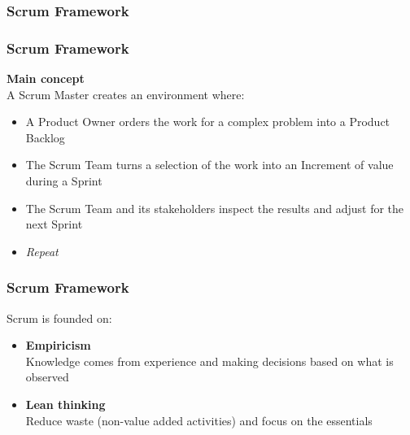 \begin{frame}
	\frametitle{Scrum Framework}
\end{frame}

\begin{frame}
	\frametitle{Scrum Framework}
		\textbf{Main concept}\\
		\vspace{0.5em}
		A Scrum Master creates an environment where:
		\vspace{0.5em}
		\begin{itemize}
			\item A Product Owner orders the work for a complex problem into a Product Backlog
			\item The Scrum Team turns a selection of the work into an Increment of value during a Sprint
			\item The Scrum Team and its stakeholders inspect the results and adjust for the next Sprint
			\item \textit{Repeat}
		\end{itemize}
\end{frame}

\begin{frame}
	\frametitle{Scrum Framework}
	Scrum is founded on:
	\vspace{1em}
	\begin{itemize}
		\setlength\itemsep{0.7em}
		\item<1-> \textbf{Empiricism}\\
		Knowledge comes from experience and making decisions based on what is observed
		\item<2-> \textbf{Lean thinking}\\
		Reduce waste (non-value added activities) and focus on the essentials
	\end{itemize}
\end{frame}

